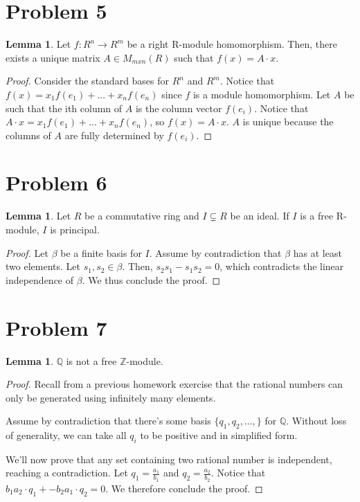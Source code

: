 \documentclass{article}
\theoremstyle{definition}
\newtheorem{lemma}[theorem]{Lemma}
\begin{document}
\section{Problem 5}

\begin{lemma}
    Let $f : R^{n} \xrightarrow{} R^{m}$ be a right R-module homomorphism. Then, there exists a unique matrix $A \in M_{mxn}(R)$ such that $f(x) = A \cdot x$.
\end{lemma}
\begin{proof}
    Consider the standard bases for $R^{n}$ and $R^{m}$. Notice that $f(x) = x_{1}f(e_{1}) + ... + x_{n}f(e_{n})$ since $f$ is a module homomorphism. Let $A$ be such that the ith column of $A$ is the column vector $f(e_{i})$. Notice that $A \cdot x = x_{1}f(e_{1}) + ... + x_{n}f(e_{n})$, so $f(x) = A \cdot x$. $A$ is unique because the columns of $A$ are fully determined by $f(e_{i})$.
\end{proof}

\section{Problem 6}

\begin{lemma}
    Let $R$ be a commutative ring and $I \subsetneq R$ be an ideal. If $I$ is a free R-module, $I$ is principal. 
\end{lemma}
\begin{proof}
    Let $\beta$ be a finite basis for $I$. Assume by contradiction that $\beta$ has at least two elements. Let $s_{1},s_{2} \in \beta$. Then, $s_{2}s_{1} - s_{1}s_{2} = 0$, which contradicts the linear independence of $\beta$. We thus conclude the proof.
\end{proof}

\section{Problem 7}

\begin{lemma}
    $\mathbb{Q}$ is not a free $\mathbb{Z}$-module.
\end{lemma}
\begin{proof}
    Recall from a previous homework exercise that the rational numbers can only be generated using infinitely many elements.
    
    Assume by contradiction that there's some basis $\{q_{1},q_{2},...,\}$ for $\mathbb{Q}$. Without loss of generality, we can take all $q_{i}$ to be positive and in simplified form.
    
    We'll now prove that any set containing two rational number is independent, reaching a contradiction. Let $q_{1} = \frac{a_{1}}{b_{1}}$ and $q_{2} = \frac{a_{2}}{b_{2}}$. Notice that $b_{1}a_{2} \cdot q_{1} + -b_{2}a_{1} \cdot q_{2} = 0$. We therefore conclude the proof.
    
\end{proof}
\end{document}
